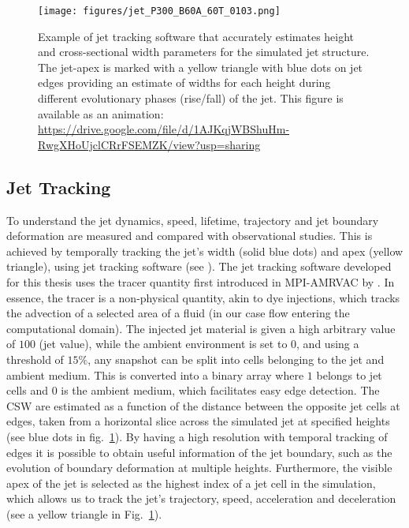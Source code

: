 \begin{figure}
\centering
{\texttt{[image: figures/jet\_P300\_B60A\_60T\_0103.png]}}
\caption{Example of jet tracking software that accurately estimates height and cross-sectional width parameters for the simulated jet structure. The jet-apex is marked with a yellow triangle with blue dots on jet edges providing an estimate of widths for each height during different evolutionary phases (rise/fall) of the jet.  This figure is available as an animation: \url{https://drive.google.com/file/d/1AJKqjWBShuHm-RwgXHoUjclCRrFSEMZK/view?usp=sharing}}
\label{jet_tracker}
\end{figure}
\subsection{Jet Tracking}
\label{subsec:jet_tracking}
To understand the jet dynamics, speed, lifetime, trajectory and jet boundary deformation are measured and compared with observational studies. This is achieved by temporally tracking the jet's width (solid blue dots) and apex (yellow triangle), using jet tracking software (see ). The jet tracking software developed for this thesis uses the tracer quantity first introduced in MPI-AMRVAC by \cite{Porth_2014}. In essence, the tracer is a non-physical quantity, akin to dye injections, which tracks the advection of a selected area of a fluid (in our case flow entering the computational domain). The injected jet material is given a high arbitrary value of $100$ (jet value), while the ambient environment is set to $0$, and using a threshold of $15\%$, any snapshot can be split into cells belonging to the jet and ambient medium. This is converted into a binary array where $1$ belongs to jet cells and $0$ is the ambient medium, which facilitates easy edge detection. The CSW are estimated as a function of the distance between the opposite jet cells at edges, taken from a horizontal slice across the simulated jet at specified heights (see blue dots in fig.~\ref{jet_tracker}). By having a high resolution with temporal tracking of edges it is possible to obtain useful information of the jet boundary, such as the evolution of boundary deformation at multiple heights. Furthermore, the visible apex of the jet is selected as the highest index of a jet cell in the simulation, which allows us to track the jet's trajectory, speed, acceleration and deceleration (see a yellow triangle in Fig.~\ref{jet_tracker}).
